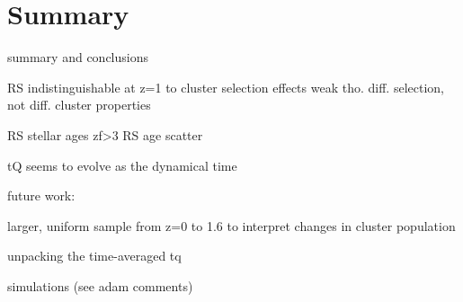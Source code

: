 \chapter{Summary}

summary and conclusions

RS indistinguishable at z=1 to cluster selection effects
weak tho. diff. selection, not diff. cluster properties

RS stellar ages zf>3
RS age scatter

tQ seems to evolve as the dynamical time

future work:

larger, uniform sample from z=0 to 1.6 to interpret
changes in cluster population

unpacking the time-averaged tq

simulations (see adam comments)
